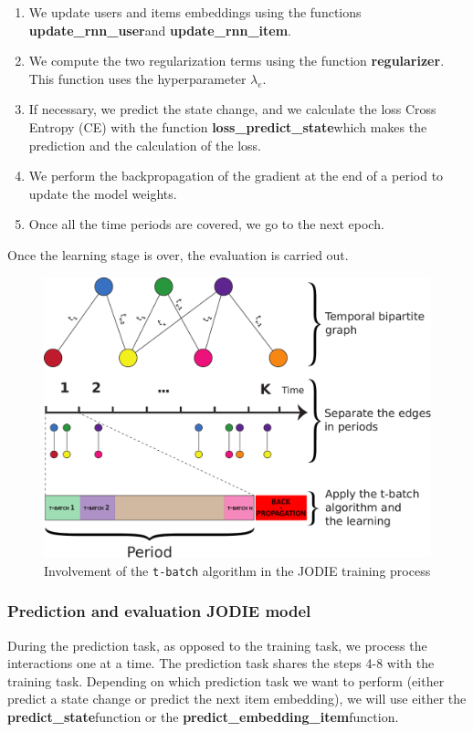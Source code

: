 \begin{enumerate}
    \item We update users and items embeddings %
    using the functions \textbf{update\_rnn\_user}\footnotemark[5] and \textbf{update\_rnn\_item}\footnotemark[5].
    \item We compute the two regularization terms using the function \textbf{regularizer}\footnotemark[3]. %
    This function uses the hyperparameter $\lambda_e$.
    \item If necessary, we predict the state change, %
    and we calculate the loss Cross Entropy (CE) with the function \textbf{loss\_predict\_state}\footnotemark[5] %
    which makes the prediction and the calculation of the loss.
    \item We perform the backpropagation %
    of the gradient at the end of a period to update the model weights.
    \item Once all the time periods are covered, we go to the next epoch.
\end{enumerate}
Once the learning stage is over, the evaluation is carried out.

\begin{figure}[htbp]
    \centering
    \includegraphics[width=.7\textwidth]{image/pipeline_t-batch.pdf}
    \caption{%
  Involvement of the \texttt{t-batch} algorithm in the JODIE training process  }
    \label{pipeline_t-batch}
\end{figure}

\subsubsection{Prediction and evaluation JODIE model}
During the prediction task, as opposed to the training task, we %
process the interactions one at a %
time. The prediction task shares %
the steps 4-8 with the training task. Depending on %
which prediction task we want to perform (either predict a state change or predict the next item embedding), we will use either the \textbf{predict\_state}\footnotemark[5] function %
or the \textbf{predict\_embedding\_item}\footnotemark[5] function.

